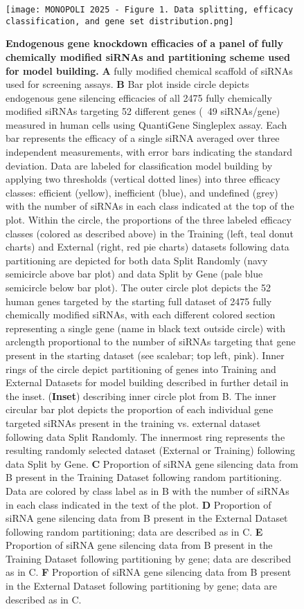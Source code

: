 \documentclass{report}
\begin{document}
\begin{figure}
    \centering
    \texttt{[image: MONOPOLI 2025 - Figure 1. Data splitting, efficacy classification, and gene set distribution.png]}
    \caption{\textbf{Endogenous gene knockdown efficacies of a panel of fully chemically modified siRNAs and partitioning scheme used for model building.} \textbf{A} fully modified chemical scaffold of siRNAs used for screening assays. \textbf{B} Bar plot inside circle depicts endogenous gene silencing efficacies of all 2475 fully chemically modified siRNAs targeting 52 different genes (~49 siRNAs/gene) measured in human cells using QuantiGene Singleplex assay. Each bar represents the efficacy of a single siRNA averaged over three independent measurements, with error bars indicating the standard deviation. Data are labeled for classification model building by applying two thresholds (vertical dotted lines) into three efficacy classes: efficient (yellow), inefficient (blue), and undefined (grey) with the number of siRNAs in each class indicated at the top of the plot. Within the circle, the proportions of the three labeled efficacy classes (colored as described above) in the Training (left, teal donut charts) and External (right, red pie charts) datasets following data partitioning are depicted for both data Split Randomly (navy semicircle above bar plot) and data Split by Gene (pale blue semicircle below bar plot). The outer circle plot depicts the 52 human genes targeted by the starting full dataset of 2475 fully chemically modified siRNAs, with each different colored section representing a single gene (name in black text outside circle) with arclength proportional to the number of siRNAs targeting that gene present in the starting dataset (see scalebar; top left, pink). Inner rings of the circle depict partitioning of genes into Training and External Datasets for model building described in further detail in the inset.  (\textbf{Inset}) describing inner circle plot from B. The inner circular bar plot depicts the proportion of each individual gene targeted siRNAs present in the training vs. external dataset following data Split Randomly. The innermost ring represents the resulting randomly selected dataset (External or Training) following data Split by Gene. \textbf{C} Proportion of siRNA gene silencing data from B present in the Training Dataset following random partitioning. Data are colored by class label as in B with the number of siRNAs in each class indicated in the text of the plot. \textbf{D} Proportion of siRNA gene silencing data from B present in the External Dataset following random partitioning; data are described as in C. \textbf{E} Proportion of siRNA gene silencing data from B present in the Training Dataset following partitioning by gene; data are described as in C. \textbf{F} Proportion of siRNA gene silencing data from B present in the External Dataset following partitioning by gene; data are described as in C. }
    \label{fig:Figure† 1}
\end{figure}
\end{document}
